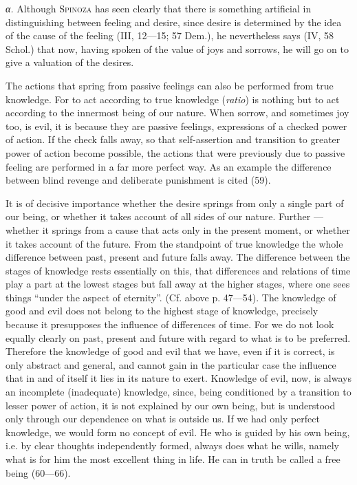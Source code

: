 \documentclass[12pt]{article}
\newcommand{\opage}[1]{\marginnote{\footnotesize\textit{[#1]}}}
\begin{document}
\textit{α.} Although \textsc{Spinoza} has seen clearly that there is something artificial in
distinguishing between feeling and desire, since desire is determined by the idea of the cause of
the feeling (III, 12---15; 57 Dem.), he nevertheless says (IV, 58 Schol.) that now, having spoken of
the value of joys and sorrows, he will go on to give a valuation of the desires.

The actions that spring from passive feelings can also be performed from true knowledge. For to act
according to true knowledge (\textit{ratio}) is nothing but to act according to the innermost being
of our nature. When sorrow, and sometimes joy too, is evil, it is because they are passive
feelings, expressions of a checked power of action. If the check falls away, so that self-assertion
and transition to greater power of action become possible, the actions that were previously due to
passive feeling are performed in a far more perfect way. As an example the difference between
blind revenge and deliberate punishment is cited (59).

It is of decisive importance whether the desire springs from only a single part of our being, or
whether it takes account of all sides of our nature. Further --- whether it springs from a cause
that acts only in the present moment, or whether it takes account of the future. From the
standpoint of true knowledge the whole difference between past, present and future falls away. The
difference between the stages of knowledge rests essentially on this, that differences and
relations of time play a part at the lowest stages but fall away at the higher stages, where one
sees things ``under the aspect of eternity''. (Cf. above p. 47---54). The knowledge of good and evil
does not belong to the highest stage of knowledge, precisely because it presupposes the influence
of differences of time. For we do not look equally clearly on past, present and future with regard
to what is to be preferred. Therefore the knowledge of good and evil that we have, even if it is
correct, is only abstract and general, and cannot gain in the particular case the influence that in
and of itself it lies in its nature to exert. Knowledge of evil, now, is always an incomplete
(inadequate) knowledge, since, \opage{81}being conditioned by a transition to lesser power of
action, it is not explained by our own being, but is understood only through our dependence on what
is outside us. If we had only perfect knowledge, we would form no concept of evil. He who is guided
by his own being, i.e. by clear thoughts independently formed, always does what he wills, namely
what is for him the most excellent thing in life. He can in truth be called a free being (60---66).
\end{document}
